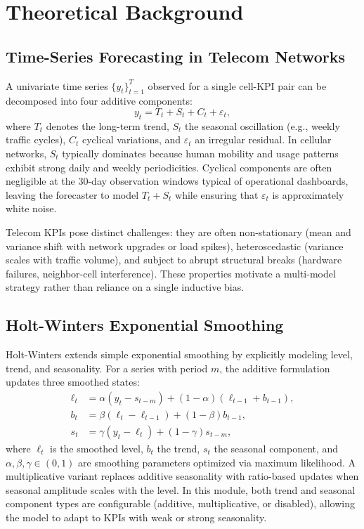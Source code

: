 \section{Theoretical Background}
\label{sec:forecasting_theory}

\subsection{Time-Series Forecasting in Telecom Networks}

A univariate time series $\{y_t\}_{t=1}^{T}$ observed for a single cell-KPI pair can be decomposed into four additive components:
\begin{equation}
y_t = T_t + S_t + C_t + \varepsilon_t,
\end{equation}
where $T_t$ denotes the long-term trend, $S_t$ the seasonal oscillation (e.g., weekly traffic cycles), $C_t$ cyclical variations, and $\varepsilon_t$ an irregular residual. In cellular networks, $S_t$ typically dominates because human mobility and usage patterns exhibit strong daily and weekly periodicities. Cyclical components are often negligible at the 30-day observation windows typical of operational dashboards, leaving the forecaster to model $T_t + S_t$ while ensuring that $\varepsilon_t$ is approximately white noise.

Telecom KPIs pose distinct challenges: they are often non-stationary (mean and variance shift with network upgrades or load spikes), heteroscedastic (variance scales with traffic volume), and subject to abrupt structural breaks (hardware failures, neighbor-cell interference). These properties motivate a multi-model strategy rather than reliance on a single inductive bias.

\subsection{Holt-Winters Exponential Smoothing}

Holt-Winters extends simple exponential smoothing by explicitly modeling level, trend, and seasonality. For a series with period $m$, the additive formulation updates three smoothed states:
\begin{align}
\ell_t &= \alpha\left(y_t - s_{t-m}\right) + (1-\alpha)\left(\ell_{t-1} + b_{t-1}\right), \\
b_t &= \beta\left(\ell_t - \ell_{t-1}\right) + (1-\beta)b_{t-1}, \\
s_t &= \gamma\left(y_t - \ell_t\right) + (1-\gamma)s_{t-m},
\end{align}
where $\ell_t$ is the smoothed level, $b_t$ the trend, $s_t$ the seasonal component, and $\alpha, \beta, \gamma \in (0,1)$ are smoothing parameters optimized via maximum likelihood. A multiplicative variant replaces additive seasonality with ratio-based updates when seasonal amplitude scales with the level. In this module, both trend and seasonal component types are configurable (additive, multiplicative, or disabled), allowing the model to adapt to KPIs with weak or strong seasonality.

